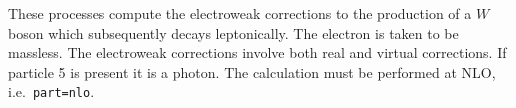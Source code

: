 \label{subsec:wbosonew}

These processes compute the electroweak corrections to the production of
a $W$ boson which subsequently decays leptonically.
The electron is taken to be massless.
The electroweak corrections involve both real and virtual corrections.
If particle 5 is present it is a photon.
The calculation must be performed at NLO, i.e.~{\tt part=nlo}.
